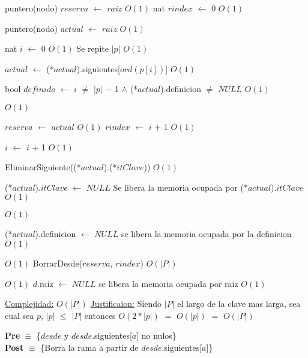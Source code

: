 \begin{Algoritmos}
\begin{algorithm}[H]
\begin{algorithmic}[1]
\State puntero(nodo) $reserva$ $\gets$ $raiz$ \Comment $O(1)$ 
\State nat $rindex$ $\gets$ 0 \Comment $O(1)$

\State puntero(nodo) $actual$ $\gets$ $raiz$ \Comment $O(1)$ 

\State nat $i$ $\gets$ 0 \Comment $O(1)$
   \Comment Se repite $|p|$ $O(1)$
		
	
	
	\State $actual$ $\gets$ (*$actual$).siguientes[$ord(p[i])$] \Comment $O(1)$

	\State bool $definido$ $\gets$ $i$ $\neq$ $|p|$ $-$ 1 $\land$ (*$actual$).definicion $\neq$ $NULL$ \Comment $O(1)$

	 \Comment $O(1)$

	\State $reserva$ $\gets$ $actual$ \Comment $O(1)$
	\State $rindex$ $\gets$ $i$ $+$ 1 \Comment $O(1)$
	
	\EndIf

	\State $i$ $\gets$ $i$ $+$ 1 \Comment $O(1)$
\EndWhile 


\State EliminarSiguiente((*$actual$).(*$itClave$)) \Comment $O(1)$

\State (*$actual$).$itClave$ $\gets$ $NULL$ \Comment Se libera la memoria ocupada por (*$actual$).$itClave$ $O(1)$

 \Comment $O(1)$

	\State (*$actual$).definicion $\gets$ $NULL$ \Comment se libera la memoria ocupada por la definicion $O(1)$

\EndIf 

 \Comment $O(1)$
	\State BorrarDesde($reserva$, $rindex$) \Comment $O(|P|)$
\EndIf 


 \Comment $O(1)$
	\State $d$.raiz $\gets$ $NULL$ \Comment se libera la memoria ocupada por raiz $O(1)$
\EndIf 


\medskip
\State \underline{Complejidad:} $O(|P|)$
\State \underline{Justificaion:} Siendo $|P|$ el largo de la clave mas larga, sea cual sea $p$, $|p|$ $\leq$ $|P|$ entonces $O(2*|p|)$ $=$	$O(|p|)$ $=$ $O(|P|)$

\end{algorithmic}
\end{algorithm}
  
\pagebreak
  
\textbf{Pre} $\equiv$ \{$desde$ y $desde$.siguientes[$a$] no nulos\}\\%
\textbf{Post} $\equiv$ \{Borra la rama a partir de $desde$.siguientes[$a$]\}%


\end{Algoritmos}
